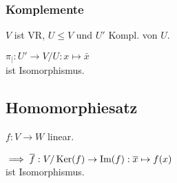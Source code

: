 \subsubsection*{Komplemente}
$V$ ist VR, $U \le V$ und $U'$ Kompl. von $U$.

$\pi_{\mid}: U' \to V/U: x \mapsto \bar x$ \\
ist Isomorphismus.

\subsection*{Homomorphiesatz}
$f: V \to W$ linear.

$\implies \overline f: V/\operatorname{Ker}(f) \to \operatorname{Im}(f): \overline x \mapsto f(x)$ \\
ist Isomorphismus.
